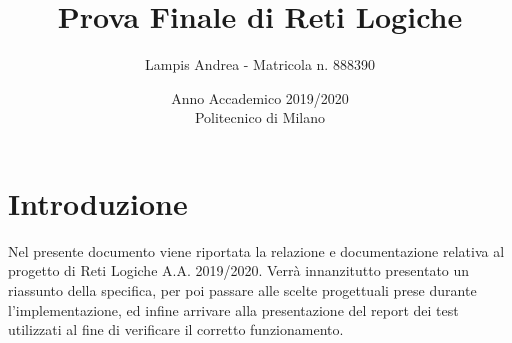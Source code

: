 \documentclass{article}
\title{Prova Finale di Reti Logiche}
\author{Lampis Andrea - Matricola n. 888390}
\date{Anno Accademico 2019/2020\\[10pt]Politecnico di Milano}
\begin{document}
\maketitle
\tableofcontents


\pagebreak
\section{Introduzione} \label{subsection-introduz}
Nel presente documento viene riportata la relazione e documentazione relativa al progetto di Reti Logiche A.A. 2019/2020.
Verrà innanzitutto presentato un riassunto della specifica, per poi passare alle scelte progettuali prese durante l'implementazione, ed infine arrivare alla presentazione del report dei test utilizzati al fine di verificare il corretto funzionamento.
\end{document}
